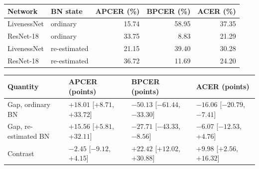 \begin{tabular}{llrrr}
\hline
Network & BN state & APCER (\%) & BPCER (\%) & ACER (\%) \\
\hline
LivenessNet & ordinary & 15.74 & 58.95 & 37.35 \\
ResNet-18 & ordinary & 33.75 & 8.83 & 21.29 \\
LivenessNet & re-estimated & 21.15 & 39.40 & 30.28 \\
ResNet-18 & re-estimated & 36.72 & 11.69 & 24.20 \\
\hline
\end{tabular}

\begin{tabular}{llll}
\hline
Quantity & APCER (points) & BPCER (points) & ACER (points) \\
\hline
Gap, ordinary BN & $+18.01$ [$+8.71$, $+33.72$] & $-50.13$ [$-61.44$, $-33.30$] & $-16.06$ [$-20.79$, $-7.41$] \\
Gap, re-estimated BN & $+15.56$ [$+5.81$, $+32.11$] & $-27.71$ [$-43.33$, $-8.56$] & $-6.07$ [$-12.53$, $+4.76$] \\
Contrast & $-2.45$ [$-9.12$, $+4.15$] & $+22.42$ [$+12.02$, $+30.88$] & $+9.98$ [$+2.56$, $+16.32$] \\
\hline
\end{tabular}
